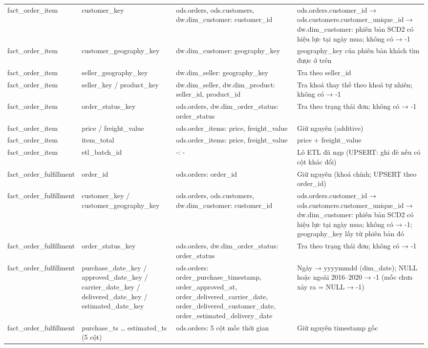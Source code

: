 {\begin{longtable}{p{2.4cm}p{3.1cm}p{3.6cm}p{5.4cm}}
fact\_order\_item & customer\_key & ods.orders, ods.customers, dw.dim\_customer: customer\_id & ods.orders.customer\_id → ods.customers.customer\_unique\_id → dw.dim\_customer: phiên bản SCD2 có hiệu lực tại ngày mua; không có → -1 \\
fact\_order\_item & customer\_geography\_key & dw.dim\_customer: geography\_key & geography\_key của phiên bản khách tìm được ở trên \\
fact\_order\_item & seller\_geography\_key & dw.dim\_seller: geography\_key & Tra theo seller\_id \\
fact\_order\_item & seller\_key / product\_key & dw.dim\_seller, dw.dim\_product: seller\_id, product\_id & Tra khoá thay thế theo khoá tự nhiên; không có → -1 \\
fact\_order\_item & order\_status\_key & ods.orders, dw.dim\_order\_status: order\_status & Tra theo trạng thái đơn; không có → -1 \\
fact\_order\_item & price / freight\_value & ods.order\_items: price, freight\_value & Giữ nguyên (additive) \\
fact\_order\_item & item\_total & ods.order\_items: price, freight\_value & price + freight\_value \\
fact\_order\_item & etl\_batch\_id & -: - & Lô ETL đã nạp (UPSERT: ghi đè nếu có cột khác đổi) \\
fact\_order\_fulfillment & order\_id & ods.orders: order\_id & Giữ nguyên (khoá chính; UPSERT theo order\_id) \\
fact\_order\_fulfillment & customer\_key / customer\_geography\_key & ods.orders, ods.customers, dw.dim\_customer: customer\_id & ods.orders.customer\_id → ods.customers.customer\_unique\_id → dw.dim\_customer: phiên bản SCD2 có hiệu lực tại ngày mua; không có → -1; geography\_key lấy từ phiên bản đó \\
fact\_order\_fulfillment & order\_status\_key & ods.orders, dw.dim\_order\_status: order\_status & Tra theo trạng thái đơn; không có → -1 \\
fact\_order\_fulfillment & purchase\_date\_key / approved\_date\_key / carrier\_date\_key / delivered\_date\_key / estimated\_date\_key & ods.orders: order\_purchase\_timestamp, order\_approved\_at, order\_delivered\_carrier\_date, order\_delivered\_customer\_date, order\_estimated\_delivery\_date & Ngày → yyyymmdd (dim\_date); NULL hoặc ngoài 2016–2020 → -1 (mốc chưa xảy ra = NULL → -1) \\
fact\_order\_fulfillment & purchase\_ts … estimated\_ts (5 cột) & ods.orders: 5 cột mốc thời gian & Giữ nguyên timestamp gốc \\

\end{longtable}}
